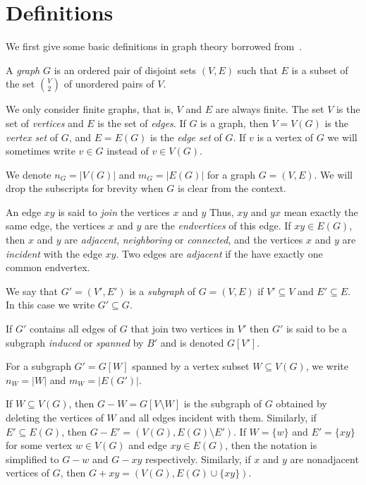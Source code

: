 \section{Definitions}

We first give some basic definitions in graph theory borrowed from~\cite{bollobás1998modern}.

\begin{defn}[graph]
    A \emph{graph} $G$ is an ordered pair of disjoint sets $(V, E)$ such that $E$ is a subset of the set $V \choose 2$ of unordered pairs of $V$. 
\end{defn}

We only consider finite graphs, that is, $V$ and $E$ are always finite. The set $V$ is the set of \emph{vertices} and $E$ is the set of \emph{edges}. If $G$ is a graph, then $V = V(G)$ is the \emph{vertex set} of $G$, and $E = E(G)$ is the \emph{edge set} of $G$. If $v$ is a vertex of $G$ we will sometimes write $v \in G$ instead of $v \in V(G)$. 

We denote $n_G = |V(G)|$ and $m_G = |E(G)|$ for a graph $G = (V, E)$. We will drop the subscripts for brevity when $G$ is clear from the context.

An edge $xy$ is said to \emph{join} the vertices $x$ and $y$ Thus, $xy$ and $yx$ mean exactly the same edge, the vertices $x$ and $y$ are the \emph{endvertices} of this edge. If $xy \in E(G)$, then $x$ and $y$ are \emph{adjacent}, \emph{neighboring} or \emph{connected}, and the  vertices $x$ and $y$ are \emph{incident} with the edge $xy$. Two edges are \emph{adjacent} if the have exactly one common endvertex.

\begin{defn}[subgraph]
    We say that $G' = (V', E')$ is a \emph{subgraph} of $G = (V, E)$ if $V' \subseteq V$ and $E' \subseteq E$. In this case we write $G' \subseteq G$. 
    
    If $G'$ contains all edges of $G$ that join two vertices in $V'$ then $G'$ is said to be a subgraph \emph{induced} or \emph{spanned} by $B'$ and is denoted $G[V']$. 
\end{defn}

For a subgraph $G' = G[W]$ spanned by a vertex subset $W \subseteq V(G)$, we write $n_W = |W|$ and $m_W = |E(G')|$.

If $W \subseteq V(G)$, then $G - W = G[V \setminus W]$ is the subgraph of $G$ obtained by deleting the vertices of $W$ and all edges incident with them. Similarly, if $E' \subseteq E(G)$, then $G - E' = (V(G), E(G) \setminus E')$. If $W = \{ w \}$ and $E' = \{ xy \}$ for some vertex $w \in V(G)$ and edge $xy \in E(G)$, then the notation is simplified to $G - w$ and $G - xy$ respectively. Similarly, if $x$ and $y$ are nonadjacent vertices of $G$, then $G + xy = (V(G), E(G) \cup \{ xy \})$.

